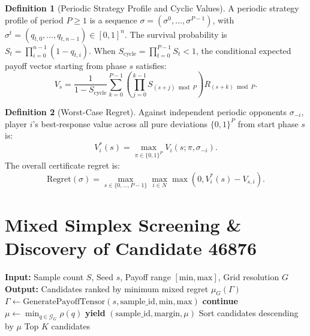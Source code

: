 \documentclass[11pt,a4paper]{article}
\theoremstyle{definition}
\newtheorem{definition}{Definition}
\begin{document}
\begin{definition}[Periodic Strategy Profile and Cyclic Values]
A periodic strategy profile of period $P \ge 1$ is a sequence $\sigma = (\sigma^0, \dots, \sigma^{P-1})$, with $\sigma^t = (q_{t,0}, \dots, q_{t,n-1}) \in [0, 1]^n$.
The survival probability is $S_t = \prod_{i=0}^{n-1} (1 - q_{t,i})$.
When $S_{\text{cycle}} = \prod_{t=0}^{P-1} S_t < 1$, the conditional expected payoff vector starting from phase $s$ satisfies:
\begin{equation}
V_s = \frac{1}{1 - S_{\text{cycle}}} \sum_{k=0}^{P-1} \left( \prod_{j=0}^{k-1} S_{(s+j) \bmod P} \right) R_{(s+k) \bmod P}.
\end{equation}
\end{definition}

\begin{definition}[Worst-Case Regret]
Against independent periodic opponents $\sigma_{-i}$, player $i$'s best-response value across all pure deviations $\{0, 1\}^P$ from start phase $s$ is:
\begin{equation}
V_i^*(s) = \max_{\pi \in \{0, 1\}^P} V_i(s; \pi, \sigma_{-i}).
\end{equation}
The overall certificate regret is:
\begin{equation}
\text{Regret}(\sigma) = \max_{s \in \{0, \dots, P-1\}} \max_{i \in N} \max(0, V_i^*(s) - V_{s,i}).
\end{equation}
\end{definition}

\section{Mixed Simplex Screening \& Discovery of Candidate 46876}

\begin{algorithm}[H]
\caption{Parallel Mixed Simplex Screening Engine}
\begin{algorithmic}[1]
\State \textbf{Input:} Sample count $S$, Seed $s$, Payoff range $[\text{min}, \text{max}]$, Grid resolution $G$
\State \textbf{Output:} Candidates ranked by minimum mixed regret $\mu_G(\Gamma)$
    \State $\Gamma \gets \text{GeneratePayoffTensor}(s, \text{sample\_id}, \text{min}, \text{max})$
        \State \textbf{continue} 
    \EndIf
    \State $\mu \gets \min_{q \in \mathcal{G}_G} \rho(q)$
    \State \textbf{yield} $(\text{sample\_id}, \text{margin}, \mu)$
\EndFor
\State Sort candidates descending by $\mu$
\State \Return Top $K$ candidates
\end{algorithmic}
\end{algorithm}
\end{document}
